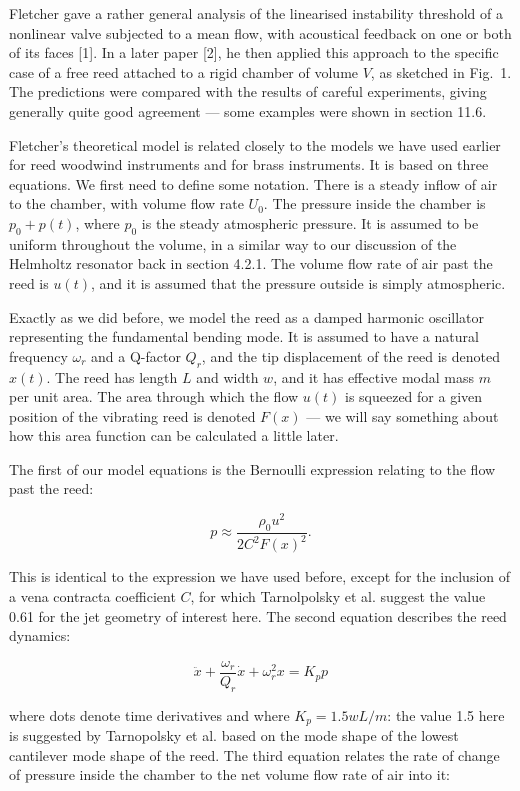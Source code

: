   Fletcher gave a rather general analysis of the linearised instability 
  threshold of a nonlinear valve subjected to a mean flow, with acoustical 
  feedback on one or both of its faces [1]. In a later paper [2], he then 
  applied this approach to the specific case of a free reed attached to a rigid 
  chamber of volume $V$, as sketched in Fig.\ 1. The predictions were compared 
  with the results of careful experiments, giving generally quite good 
  agreement --- some examples were shown in section 11.6. 

  Fletcher's theoretical model is related closely to the models we have used 
  earlier for reed woodwind instruments and for brass instruments. It is based 
  on three equations. We first need to define some notation. There is a steady 
  inflow of air to the chamber, with volume flow rate $U_0$. The pressure 
  inside the chamber is $p_0+p(t)$, where $p_0$ is the steady atmospheric 
  pressure. It is assumed to be uniform throughout the volume, in a similar way 
  to our discussion of the Helmholtz resonator back in section 4.2.1. The 
  volume flow rate of air past the reed is $u(t)$, and it is assumed that the 
  pressure outside is simply atmospheric. 

  Exactly as we did before, we model the reed as a damped harmonic oscillator 
  representing the fundamental bending mode. It is assumed to have a natural 
  frequency $\omega_r$ and a Q-factor $Q_r$, and the tip displacement of the 
  reed is denoted $x(t)$. The reed has length $L$ and width $w$, and it has 
  effective modal mass $m$ per unit area. The area through which the flow 
  $u(t)$ is squeezed for a given position of the vibrating reed is denoted 
  $F(x)$ --- we will say something about how this area function can be 
  calculated a little later. 

  The first of our model equations is the Bernoulli expression relating to the 
  flow past the reed: 

  $$p \approx \dfrac{\rho_0 u^2}{2 C^2 F(x)^2} . \tag{1}$$ 

  This is identical to the expression we have used before, except for the 
  inclusion of a vena contracta coefficient $C$, for which Tarnolpolsky et al. 
  suggest the value 0.61 for the jet geometry of interest here. The second 
  equation describes the reed dynamics: 

  $$\ddot{x}+\dfrac{\omega_r}{Q_r}\dot{x}+\omega_r^2 x = K_p p \tag{2}$$ 

  where dots denote time derivatives and where $K_p =1.5 w L/m$: the value 1.5 
  here is suggested by Tarnopolsky et al. based on the mode shape of the lowest 
  cantilever mode shape of the reed. The third equation relates the rate of 
  change of pressure inside the chamber to the net volume flow rate of air into 
  it: 

